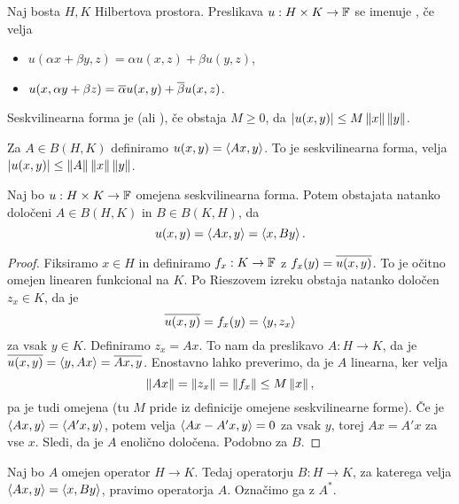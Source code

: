 
\begin{definicija}
  Naj bosta $H, K$ Hilbertova prostora.
  Preslikava $u: H \times K \to \mathbb{F}$ se imenuje , če
  velja
  \begin{itemize}
  \item $u(\alpha x + \beta y, z) = \alpha u(x, z) + \beta u(y, z)$,
  \item $u(x, \alpha y + \beta z) = \overline{\alpha} u(x,y) + \overline{\beta} u(x,z)$.
  \end{itemize}
\end{definicija}

\begin{definicija}
  Seskvilinearna forma je  (ali ), če obstaja $M
  \ge 0$, da $\left| u(x,y) \right| \le M \left\lVert x\right\rVert \left\lVert y\right\rVert$.
\end{definicija}

\begin{primer}
  Za $A \in B(H, K)$ definiramo $u(x,y) = \left< Ax,y \right>$.
  To je seskvilinearna forma, velja $\left| u(x,y) \right| \le \left\lVert A\right\rVert \left\lVert x\right\rVert
  \left\lVert y\right\rVert$.
\end{primer}

\begin{izrek}
  Naj bo $u: H \times K \to \mathbb{F}$ omejena seskvilinearna forma.
  Potem obstajata natanko določeni $A \in B(H,K)$ in $B \in B(K,H)$, da
  \[
	u(x,y) = \left< Ax,y \right> = \left< x, By \right>.
  \]
\end{izrek}

\begin{proof}
  Fiksiramo $x \in H$ in definiramo $f_x: K \to \mathbb{F}$ z $f_x(y) = \overline{u(x,y)}$.
  To je očitno omejen linearen funkcional na $K$.
  Po Rieszovem izreku obstaja natanko določen $z_x \in K$, da je
  \[
	\overline{u(x,y)} = f_x(y) = \left< y, z_x \right>
  \]
  za vsak $y \in K$.
  Definiramo $z_x = Ax$.
  To nam da preslikavo $A: H \to K$, da je $\overline{u(x,y)} = \left< y, Ax \right> =
  \overline{Ax, y}$.
  Enostavno lahko preverimo, da je $A$ linearna, ker velja
  \[
	\left\lVert Ax\right\rVert = \left\lVert z_x\right\rVert = \left\lVert f_x\right\rVert \le M \left\lVert x\right\rVert,
  \]
  pa je tudi omejena (tu $M$ pride iz definicije omejene seskvilinearne forme).
  Če je $\left< Ax, y \right> = \left< A' x, y \right>$, potem velja $\left< Ax - A'x, y \right> = 0$ za vsak
  $y$, torej $Ax = A'x$ za vse $x$.
  Sledi, da je $A$ enolično določena.
  Podobno za $B$.
\end{proof}

\begin{definicija}
  Naj bo $A$ omejen operator $H \to K$.
  Tedaj operatorju $B: H \to K$, za katerega velja $\left< Ax,y \right> = \left< x,By \right>$,
  pravimo  operatorja $A$.
  Označimo ga z $A^*$.
\end{definicija}

